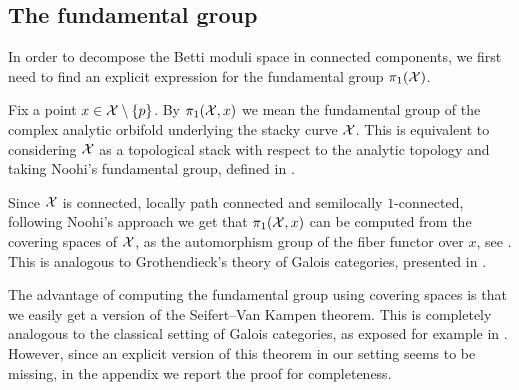 \documentclass{article}
\begin{document}
\subsection{The fundamental group}
In order to decompose the Betti moduli space in connected components, we first need to find an explicit expression for the fundamental group $\pi_1(\mathcal{X})$.

Fix a point $x \in \mathcal{X} \setminus \{p\}$. By $\pi_1(\mathcal{X}, x)$ we mean the fundamental group of the complex analytic orbifold underlying the stacky curve $\mathcal{X}$. This is equivalent to considering $\mathcal{X}$ as a topological stack with respect to the analytic topology and taking Noohi's fundamental group, defined in \cite{Noohi-foundations}.

Since $\mathcal{X}$ is connected, locally path connected and semilocally $1$-connected, following Noohi's approach we get that $\pi_1(\mathcal{X}, x)$ can be computed from the covering spaces of $\mathcal{X}$, as the automorphism group of the fiber functor over $x$, see \cite[{}18.13, 18.19, 18.22]{Noohi-foundations}. This is analogous to Grothendieck's theory of Galois categories, presented in \cite[]{SGA1-IX}.

The advantage of computing the fundamental group using covering spaces is that we easily get a version of the Seifert--Van Kampen theorem. This is completely analogous to the classical setting of Galois categories, as exposed for example in \cite[Theorem 4.7.7]{Douady2020}. However, since an explicit version of this theorem in our setting seems to be missing, in the appendix we report the proof for completeness.
\end{document}
